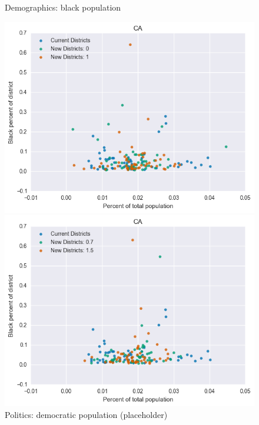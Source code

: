 \begin{figure}[htb!] \centering
\caption{ Demographics: black population }
\includegraphics[width=4.5in]{../analysis/CA/analysis_scatter.png}
\caption{ Politics: democratic population (placeholder)}
\includegraphics[width=4.5in]{../analysis/CA/analysis_scatter2.png}
\end{figure}

\clearpage
\newpage

